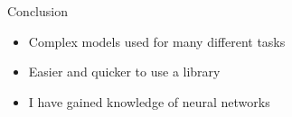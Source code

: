 \documentclass{beamer}
\begin{document}
\begin{frame}{Conclusion}
    \begin{itemize}
        \item Complex models used for many different tasks
        \item Easier and quicker to use a library
        \item I have gained knowledge of neural networks
    \end{itemize}
\end{frame}
\end{document}
